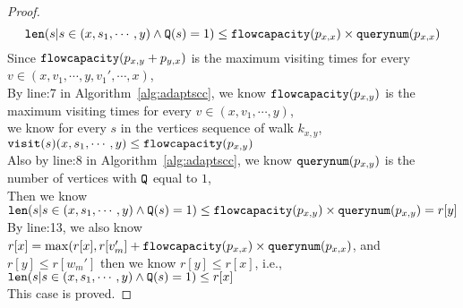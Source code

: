 \begin{proof}
  $$ 
  \mathtt{len}(s | s \in (x, s_1, \cdots, y) \land \mathtt{Q}(s) = 1) \leq \mathtt{flowcapacity}(p_{x, x}) \times \mathtt{querynum}(p_{x, x}) 
  $$
Since $\mathtt{flowcapacity}(p_{x, y} + p_{y, x})$ is the maximum visiting times for every $v \in (x, v_1, \cdots, y, v_1', \cdots, x)$, 
\\
By line:7 in Algorithm~\ref{alg:adaptscc}, we know $\mathtt{flowcapacity}(p_{x, y})$ is the maximum visiting times for every $v \in (x, v_1, \cdots, y)$, 
\\
we know for every $s$ in the vertices sequence of walk $k_{x,y}$, 
$\mathtt{visit}(s) (x, s_1, \cdots, y)  \leq \mathtt{flowcapacity}(p_{x, y})$
  \\
  Also by line:8 in Algorithm~\ref{alg:adaptscc}, we know $\mathtt{querynum}(p_{x, y})$ is the number of vertices with $\mathtt{Q}$ equal to $1$,
  \\
  Then we know 
  \\
  $\mathtt{len}(s | s \in (x, s_1, \cdots, y) \land \mathtt{Q}(s) = 1) \leq \mathtt{flowcapacity}(p_{x, y}) \times \mathtt{querynum}(p_{x, y}) = r[y]$
  \\
  By line:13, we also know $r[x] = \max(r[x], r[v_{m}'] + \mathtt{flowcapacity}(p_{x, x}) \times \mathtt{querynum}(p_{x, x})$, and $r[y] \leq r[w_{m}']$
  then we know $r[y] \leq r[x]$, i.e., 
  $\mathtt{len}(s | s \in (x, s_1, \cdots, y) \land \mathtt{Q}(s) = 1) \leq r[x]$
  \\
  This case is proved.
%
%
\end{proof}